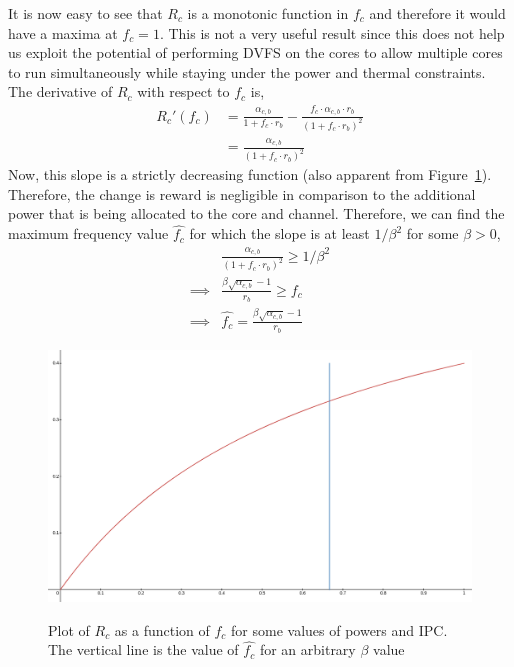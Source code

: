 \documentclass[11pt]{article}
\begin{document}
It is now easy to see that $R_c$ is a monotonic function in $f_c$ and therefore it would have a maxima at $f_c = 1$. This is not a very useful result since this does not help us exploit the potential of performing DVFS on the cores to allow multiple cores to run simultaneously while staying under the power and thermal constraints. The derivative of $R_c$ with respect to $f_c$ is,
\begin{equation}
    \begin{split}
        R_c'(f_c) &= \frac{\alpha_{c,b}}{1 + f_c\cdot r_b} - \frac{f_c\cdot\alpha_{c,b}\cdot r_b}{(1 + f_c\cdot r_b)^2}\\
        &= \frac{\alpha_{c,b}}{(1 + f_c\cdot r_b)^2}
    \end{split}
\end{equation}
Now, this slope is a strictly decreasing function (also apparent from Figure~\ref{fig:rcfc}). Therefore, the change is reward is negligible in comparison to the additional power that is being allocated to the core and channel. Therefore, we can find the maximum frequency value $\hat{f_c}$ for which the slope is at least $1/\beta^2$ for some $\beta > 0$,
\begin{equation}
    \begin{split}
        &\frac{\alpha_{c,b}}{(1 + f_c\cdot r_b)^2} \geq 1/\beta^2\\
        \implies &\frac{\beta\sqrt{\alpha_{c,b}} - 1}{r_b} \geq f_c\\
        \implies &\hat{f_c} = \frac{\beta\sqrt{\alpha_{c,b}} - 1}{r_b}
    \end{split}
\end{equation}

\begin{figure}[H]
    \centering
    \includegraphics[width=0.75\linewidth]{rcfc.png}
    \label{fig:rcfc}
    \caption{Plot of $R_c$ as a function of $f_c$ for some values of powers and IPC. The vertical line is the value of $\hat{f_c}$ for an arbitrary $\beta$ value}
\end{figure}
\end{document}
